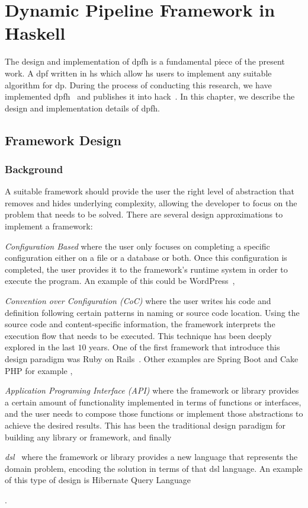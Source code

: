 \chapter{Dynamic Pipeline Framework in Haskell}\label{dp-hs}
The design and implementation of \acrfull{dpfh} is a fundamental piece of the present work. 
A \acrlong{dpf} written in \acrlong{hs} which allow \acrshort{hs} users to implement any suitable algorithm for \acrlong{dp}.
During the process of conducting this research, we have implemented \acrshort{dpfh}~\cite{dynamic-pipeline} and publishes it into \acrlong{hack}~\cite{hackage}.
In this chapter, we describe the design and implementation details of \acrshort{dpfh}.

\section{Framework Design}

\subsection{Background}
A suitable framework should provide the user the right level of abstraction that removes and hides underlying complexity, 
allowing the developer to focus on the problem that needs to be solved.
There are several design approximations to implement a framework: \begin{inparaenum}[i\upshape)]
  \item  \emph{Configuration Based} where the user only focuses on completing a specific configuration either on a file or a database or both. Once this configuration is completed, the user provides it to the framework's runtime system in order to execute the program. An example of this could be WordPress~\cite{wordpress},
  \item  \emph{Convention over Configuration (CoC)} where the user writes his code and definition following certain patterns in naming or source code location. Using the source code and content-specific information, the framework interprets the execution flow that needs to be executed. This technique has been deeply explored in the last $10$ years. One of the first framework that introduce this design paradigm was Ruby on Rails~\cite{rubyonrails}. Other examples are Spring Boot and Cake PHP for example \cite{springboot, cakephp},
  \item \emph{Application Programing Interface (API)} where the framework or library provides a certain amount of functionality implemented in terms of functions or interfaces, and the user needs to compose those functions or implement those abstractions to achieve the desired results. This has been the traditional design paradigm for building any library or framework, and finally
  \item \emph{\acrfull{dsl}}~\cite{Fowler10} where the framework or library provides a new language that represents the domain problem, encoding the solution in terms of that \acrshort{dsl} language. An example of this type of design is Hibernate Query Language~\cite{hql}
   \end{inparaenum}.

